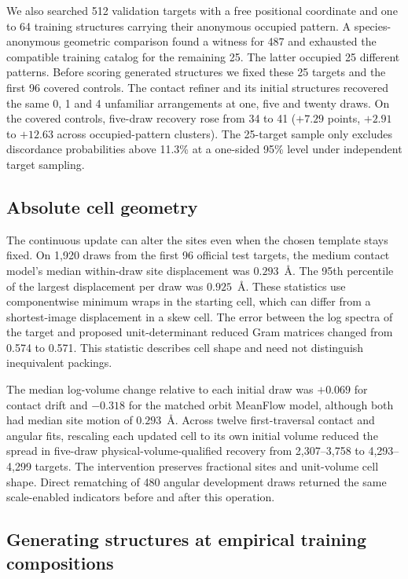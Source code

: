 We also searched 512 validation targets with a free positional coordinate and one to 64 training structures carrying their anonymous occupied pattern. A species-anonymous geometric comparison found a witness for 487 and exhausted the compatible training catalog for the remaining 25. The latter occupied 25 different patterns. Before scoring generated structures we fixed these 25 targets and the first 96 covered controls. The contact refiner and its initial structures recovered the same 0, 1 and 4 unfamiliar arrangements at one, five and twenty draws. On the covered controls, five-draw recovery rose from 34 to 41 ($+7.29$ points, $+2.91$ to $+12.63$ across occupied-pattern clusters). The 25-target sample only excludes discordance probabilities above 11.3\% at a one-sided 95\% level under independent target sampling.

\subsection{Absolute cell geometry}

The continuous update can alter the sites even when the chosen template stays fixed. On 1,920 draws from the first 96 official test targets, the medium contact model's median within-draw site displacement was $0.293$~\AA. The 95th percentile of the largest displacement per draw was $0.925$~\AA. These statistics use componentwise minimum wraps in the starting cell, which can differ from a shortest-image displacement in a skew cell. The error between the log spectra of the target and proposed unit-determinant reduced Gram matrices changed from 0.574 to 0.571. This statistic describes cell shape and need not distinguish inequivalent packings.

The median log-volume change relative to each initial draw was $+0.069$ for contact drift and $-0.318$ for the matched orbit MeanFlow model, although both had median site motion of $0.293$~\AA. Across twelve first-traversal contact and angular fits, rescaling each updated cell to its own initial volume reduced the spread in five-draw physical-volume-qualified recovery from 2,307--3,758 to 4,293--4,299 targets. The intervention preserves fractional sites and unit-volume cell shape. Direct rematching of 480 angular development draws returned the same scale-enabled indicators before and after this operation.

\subsection{Generating structures at empirical training compositions}

